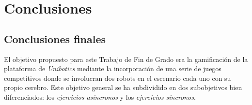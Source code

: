 \documentclass[a4paper, 12pt]{book}
\begin{document}










\cleardoublepage
\chapter{Conclusiones}
\label{chap:conclusiones}


\section{Conclusiones finales}
\label{sec:consecucion-objetivos}

El objetivo propuesto para este Trabajo de Fin de Grado era la gamificación de la plataforma de \emph{Unibotics} mediante la incorporación de una serie de juegos competitivos donde se involucran dos robots en el escenario cada uno con su propio cerebro. Este objetivo general se ha subdividido en dos subobjetivos bien diferenciados: los \emph{ejercicios asíncronos} y los \emph{ejercicios síncronos}.
\end{document}
